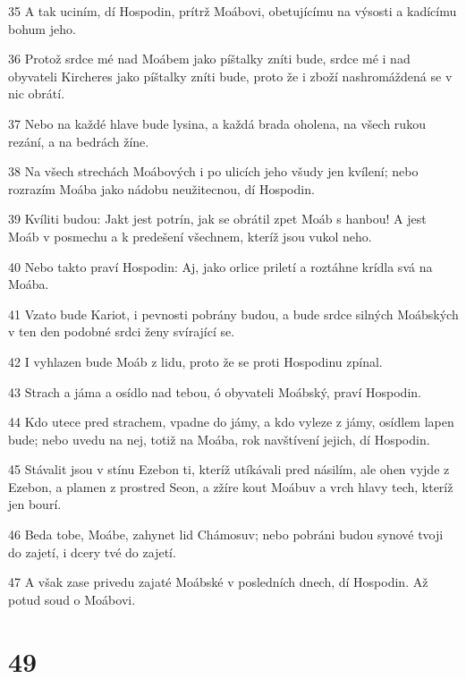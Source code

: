 \par 35 A tak uciním, dí Hospodin, prítrž Moábovi, obetujícímu na výsosti a kadícímu bohum jeho.
\par 36 Protož srdce mé nad Moábem jako píštalky zníti bude, srdce mé i nad obyvateli Kircheres jako píštalky zníti bude, proto že i zboží nashromáždená se v nic obrátí.
\par 37 Nebo na každé hlave bude lysina, a každá brada oholena, na všech rukou rezání, a na bedrách žíne.
\par 38 Na všech strechách Moábových i po ulicích jeho všudy jen kvílení; nebo rozrazím Moába jako nádobu neužitecnou, dí Hospodin.
\par 39 Kvíliti budou: Jakt jest potrín, jak se obrátil zpet Moáb s hanbou! A jest Moáb v posmechu a k predešení všechnem, kteríž jsou vukol neho.
\par 40 Nebo takto praví Hospodin: Aj, jako orlice priletí a roztáhne krídla svá na Moába.
\par 41 Vzato bude Kariot, i pevnosti pobrány budou, a bude srdce silných Moábských v ten den podobné srdci ženy svírající se.
\par 42 I vyhlazen bude Moáb z lidu, proto že se proti Hospodinu zpínal.
\par 43 Strach a jáma a osídlo nad tebou, ó obyvateli Moábský, praví Hospodin.
\par 44 Kdo utece pred strachem, vpadne do jámy, a kdo vyleze z jámy, osídlem lapen bude; nebo uvedu na nej, totiž na Moába, rok navštívení jejich, dí Hospodin.
\par 45 Stávalit jsou v stínu Ezebon ti, kteríž utíkávali pred násilím, ale ohen vyjde z Ezebon, a plamen z prostred Seon, a zžíre kout Moábuv a vrch hlavy tech, kteríž jen bourí.
\par 46 Beda tobe, Moábe, zahynet lid Chámosuv; nebo pobráni budou synové tvoji do zajetí, i dcery tvé do zajetí.
\par 47 A však zase privedu zajaté Moábské v posledních dnech, dí Hospodin. Až potud soud o Moábovi.

\chapter{49}


